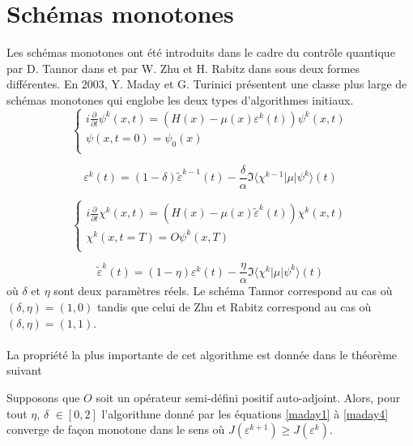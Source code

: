\section{Schémas monotones}
Les schémas monotones ont été introduits dans le cadre du contrôle quantique par D. Tannor dans \cite{Tannor} et par W. Zhu et H. Rabitz dans \cite{Zhu} sous deux formes différentes. En 2003, Y. Maday et G. Turinici \cite{Maday} présentent une classe plus large de schémas monotones qui englobe les deux types d’algorithmes initiaux.
\begin{equation} \label{maday1}
\begin{cases}
i \frac{\partial }{\partial t} \psi^k (x,t) = (H(x)-\mu(x)\varepsilon^k(t))\psi^k (x,t)\\
\psi (x,t=0) = \psi_0(x)\\
\end{cases}
\end{equation}

\begin{equation} \label{maday2}
\varepsilon^k (t) = (1-\delta)\tilde{\varepsilon}^{k-1}(t)-\frac{\delta}{\alpha} \Im\langle\chi^{k-1}|\mu|\psi^{k}\rangle(t)
\end{equation}

\begin{equation} \label{maday3}
\begin{cases}
i \frac{\partial }{\partial t} \chi^k (x,t) = (H(x)-\mu(x)\tilde{\varepsilon}^k (t))\chi^k (x,t)\\
\chi^k (x,t=T) = O\psi^k(x,T)\\
\end{cases}
\end{equation}

\begin{equation} \label{maday4}
\tilde{\varepsilon}^k (t) = (1-\eta)\varepsilon^{k}(t)-\frac{\eta}{\alpha} \Im\langle\chi^{k}|\mu|\psi^{k}\rangle(t)
\end{equation}
où $\delta$ et $\eta$ sont deux paramètres réels. Le schéma Tannor \cite{Tannor} correspond au cas où $(\delta,\eta)= (1, 0)$ tandis que celui de Zhu et Rabitz \cite{Zhu} correspond au cas où $(\delta,\eta)= (1, 1)$.\\\\
La propriété la plus importante de cet algorithme est donnée dans le théorème suivant \cite{Maday}        
\begin{theorem}
Supposons que $O$ soit un opérateur semi-défini positif auto-adjoint. Alors, pour tout $\eta$, $\delta$ $\in [0,2]$ l'algorithme donné par les équations \eqref{maday1} à \eqref{maday4} converge de façon monotone dans le sens où $J(\varepsilon^{k+1}) \geq J(\varepsilon^{k})$.
\end{theorem}

